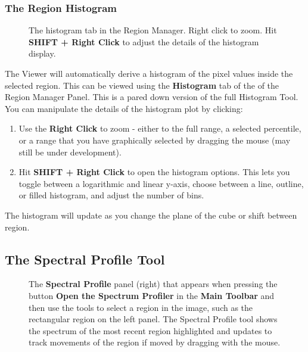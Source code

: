 \subsubsection{The Region Histogram}
\label{section:display.viewerGUI.displaypanel.region.histogram}

\begin{figure}[h!]
\begin{center}
\caption{\label{fig:viewer_regionhist} The histogram tab in the Region Manager. Right click to zoom.
Hit {\bf SHIFT + Right Click} to adjust the details of the histogram display.}
\hrulefill
\end{center}
\end{figure}

The Viewer will automatically derive a histogram of the pixel values inside the selected region.
This can be viewed using the {\bf Histogram} tab of the of the Region Manager Panel. This is 
a pared down version of the full Histogram Tool. You can manipulate the details of the histogram
plot by clicking:

\begin{enumerate}
\item Use the {\bf Right Click} to zoom - either to the full range, a selected percentile, or a range that you have graphically
selected by dragging the mouse (may still be under development).
\item Hit {\bf SHIFT + Right Click} to open the histogram options. This lets you toggle between a logarithmic and linear 
y-axis, choose between a line, outline, or filled histogram, and adjust the number of bins.
\end{enumerate}

The histogram will update as you change the plane of the cube or shift between region.

\subsection{The Spectral Profile Tool}
\label{section:display.image.specprof}

\begin{figure}[h!]
\begin{center}
\caption{\label{fig:viewer_specprof} The {\bf Spectral Profile} panel (right)
that appears when pressing the button {\bf Open the Spectrum Profiler} in the
{\bf Main Toolbar} and then use the tools to select a region in the image,
such as the rectangular region on the left panel. The Spectral Profile tool
shows the spectrum of the most recent region highlighted and updates to track movements 
of the region if moved by dragging with the mouse.} 
\hrulefill
\end{center}
\end{figure}

